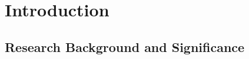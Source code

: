 
\chapter{Introduction}  %

\ifpdf
	\graphicspath{{Chapter1/Figs/Raster/}{Chapter1/Figs/PDF/}{Chapter1/Figs/}}
\else
	\graphicspath{{Chapter1/Figs/Vector/}{Chapter1/Figs/}}
\fi


\section{Research Background and Significance} %


